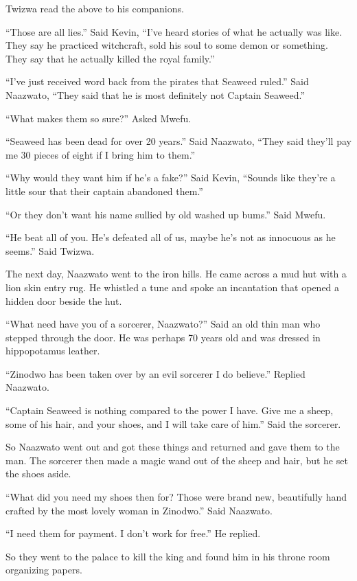 Twizwa read the above to his companions.

``Those are all lies.'' Said Kevin, ``I've heard stories of what he actually was like. They say he practiced witchcraft, sold his soul to some demon or something. They say that he actually killed the royal family.''

``I've just received word back from the pirates that Seaweed ruled.'' Said Naazwato, ``They said that he is most definitely not Captain Seaweed.''

``What makes them so sure?'' Asked Mwefu.

``Seaweed has been dead for over 20 years.'' Said Naazwato, ``They said they'll pay me 30 pieces of eight if I bring him to them.''

``Why would they want him if he's a fake?'' Said Kevin, ``Sounds like they're a little sour that their captain abandoned them.''

``Or they don't want his name sullied by old washed up bums.'' Said Mwefu.

``He beat all of you. He's defeated all of us, maybe he's not as innocuous as he seems.'' Said Twizwa.

\tbreak

The next day, Naazwato went to the iron hills. He came across a mud hut with a lion skin entry rug. He whistled a tune and spoke an incantation that opened a hidden door beside the hut.

``What need have you of a sorcerer, Naazwato?'' Said an old thin man who stepped through the door. He was perhaps 70 years old and was dressed in hippopotamus leather.

``Zinodwo has been taken over by an evil sorcerer I do believe.'' Replied Naazwato.

``Captain Seaweed is nothing compared to the power I have. Give me a sheep, some of his hair, and your shoes, and I will take care of him.'' Said the sorcerer.

So Naazwato went out and got these things and returned and gave them to the man. The sorcerer then made a magic wand out of the sheep and hair, but he set the shoes aside.

``What did you need my shoes then for?
Those were brand new, beautifully hand crafted by the most lovely woman in Zinodwo.'' Said Naazwato.

``I need them for payment. I don't work for free.'' He replied.

So they went to the palace to kill the king and found him in his throne room organizing papers.

